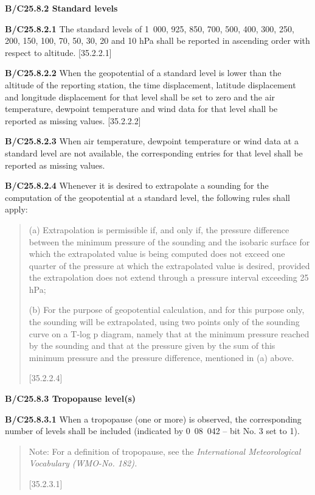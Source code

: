 \textbf{B/C25.8.2 Standard levels}

\textbf{B/C25.8.2.1} The standard levels of 1~000, 925, 850, 700, 500, 400, 300, 250, 200, 150, 100, 70, 50, 30, 20 and 10 hPa shall be reported in ascending order with respect to altitude. {[}35.2.2.1{]}

\textbf{B/C25.8.2.2} When the geopotential of a standard level is lower than the altitude of the reporting station, the time displacement, latitude displacement and longitude displacement for that level shall be set to zero and the air temperature, dewpoint temperature and wind data for that level shall be reported as missing values. {[}35.2.2.2{]}

\textbf{B/C25.8.2.3} When air temperature, dewpoint temperature or wind data at a standard level are not available, the corresponding entries for that level shall be reported as missing values.

\textbf{B/C25.8.2.4} Whenever it is desired to extrapolate a sounding for the computation of the geopotential at a standard level, the following rules shall apply:

\begin{quote}
(a) Extrapolation is permissible if, and only if, the pressure difference between the minimum pressure of the sounding and the isobaric surface for which the extrapolated value is being computed does not exceed one quarter of the pressure at which the extrapolated value is desired, provided the extrapolation does not extend through a pressure interval exceeding 25 hPa;

(b) For the purpose of geopotential calculation, and for this purpose only, the sounding will be extrapolated, using two points only of the sounding curve on a T-log p diagram, namely that at the minimum pressure reached by the sounding and that at the pressure given by the sum of this minimum pressure and the pressure difference, mentioned in (a) above.

{[}35.2.2.4{]}
\end{quote}

\textbf{B/C25.8.3 Tropopause level(s)}

\textbf{B/C25.8.3.1} When a tropopause (one or more) is observed, the corresponding number of levels shall be included (indicated by 0~08~042 -- bit No. 3 set to 1).

\begin{quote}
Note: For a definition of tropopause, see the \emph{International Meteorological Vocabulary (WMO-No. 182).}

{[}35.2.3.1{]}
\end{quote}

